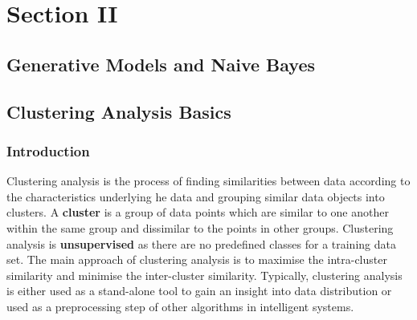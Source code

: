 \documentclass[11pt,fleqn]{book} %
\begin{document}

\part{Section II}



\chapter{Generative Models and Naive Bayes}



\chapter{Clustering Analysis Basics}

\section*{Introduction}
Clustering analysis is the process of finding similarities between data according to the characteristics underlying he data and grouping similar data objects into clusters. A \textbf{cluster} is a group of data points which are similar to one another within the same group and dissimilar to the points in other groups. Clustering analysis is \textbf{unsupervised} as there are no predefined classes for a training data set. The main approach of clustering analysis is to maximise the intra-cluster similarity and minimise the inter-cluster similarity. Typically, clustering analysis is either used as a stand-alone tool to gain an insight into data distribution or used as a preprocessing step of other algorithms in intelligent systems.\\
\end{document}
